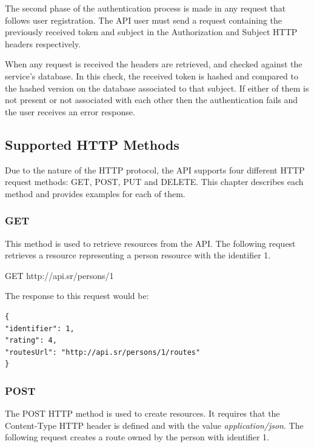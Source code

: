     The second phase of the authentication process is made in any request that follows user registration. The API user must send a request containing the previously 
    received token and subject in the Authorization and Subject HTTP headers respectively.\par
    When any request is received the headers are retrieved, and checked against the service's database. In this check, the received token is hashed and 
    compared to the hashed version on the database associated to that subject. If either of them is not present or not associated
    with each other then the authentication fails and the user receives an error response.

    \subsection*{Supported HTTP Methods}
        Due to the nature of the HTTP protocol, the API supports four different HTTP request methods: GET, POST, PUT and DELETE. This chapter describes each method and provides
        examples for each of them.
        
        \subsubsection*{GET}
            This method is used to retrieve resources from the API. The following request retrieves a resource representing
            a person resource with the identifier 1.\par
            
            GET http://api.sr/persons/1

            The response to this request would be:\newline
        \begin{lstlisting}
{
"identifier": 1,
"rating": 4,
"routesUrl": "http://api.sr/persons/1/routes"
}
        \end{lstlisting}

        \subsubsection*{POST}
            The POST HTTP method is used to create resources. It requires that the Content-Type HTTP header is defined and with the value 
            \textit{application/json}. The following request creates a route owned by the person with identifier 1.\par
            
